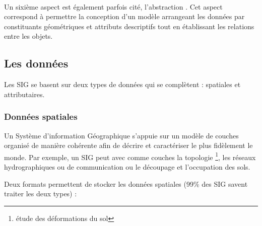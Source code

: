 \paragraph{}Un sixième aspect est également parfois cité, l’abstraction \supercite{courssig}. Cet aspect correspond à permettre la conception d'un modèle arrangeant les données par constituants géométriques et attributs descriptifs tout en établissant les relations entre les objets.


\subsection{Les données}
Les \acrshort{SIG} se basent sur deux types de données qui se complètent : spatiales et attributaires.

\subsubsection{Données spatiales}

Un Système d’information Géographique s’appuie sur un modèle de couches organisé de manière cohérente afin de décrire et caractériser le plus fidèlement le monde. Par exemple, un SIG peut avec comme couches la topologie \footnote{étude des déformations du sol}, les réseaux hydrographiques ou de communication ou le découpage et l'occupation des sols.

Deux formats permettent de stocker les données spatiales (99\% des SIG savent traiter les deux types) :

